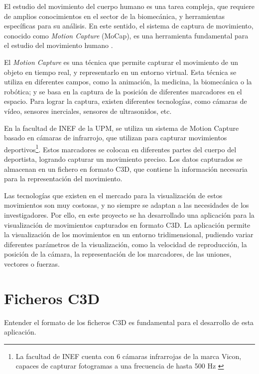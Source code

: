 \noindent El estudio del movimiento del cuerpo humano es una tarea compleja, que requiere de amplios conocimientos en el sector de la biomecánica, y herramientas específicas para su análisis. En este sentido, el sistema de captura de movimiento, conocido como \textit{Motion Capture} (MoCap), es una herramienta fundamental para el estudio del movimiento humano \autocite{taiQueEsMotion2024}.

El \textit{Motion Capture} es una técnica que permite capturar el movimiento de un objeto en tiempo real, y representarlo en un entorno virtual. Esta técnica se utiliza en diferentes campos, como la animación, la medicina, la biomecánica o la robótica; y se basa en la captura de la posición de diferentes marcadores en el espacio. Para lograr la captura, existen diferentes tecnologías, como cámaras de vídeo, sensores inerciales, sensores de ultrasonidos, etc. \autocite{taiQueEsMotion2024}

En la facultad de INEF de la UPM, se utiliza un sistema de Motion Capture basado en cámaras de infrarrojo, que utilizan para capturar movimientos deportivos\footnote{La facultad de INEF cuenta con 6 cámaras infrarrojas de la marca Vicon, capaces de capturar fotogramas a una frecuencia de hasta 500 Hz \autocite{FacultadCienciasActividad}}. Estos marcadores se colocan en diferentes partes del cuerpo del deportista, logrando capturar un movimiento preciso. Los datos capturados se almacenan en un fichero en formato C3D, que contiene la información necesaria para la representación del movimiento.

Las tecnologías que existen en el mercado para la visualización de estos movimientos son muy costosas, y no siempre se adaptan a las necesidades de los investigadores. Por ello, en este proyecto se ha desarrollado una aplicación para la visualización de movimientos capturados en formato C3D. La aplicación permite la visualización de los movimientos en un entorno tridimensional, pudiendo variar diferentes parámetros de la visualización, como la velocidad de reproducción, la posición de la cámara, la representación de los marcadores, de las uniones, vectores o fuerzas.

\section{Ficheros C3D} \label{sec:ficheros-c3d}

\noindent Entender el formato de los ficheros C3D es fundamental para el desarrollo de esta aplicación. 

